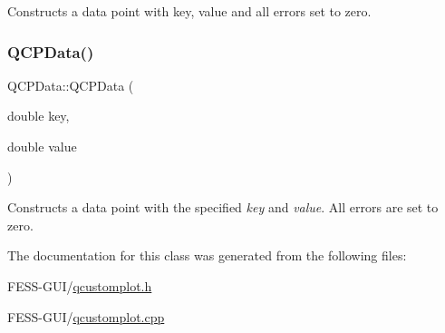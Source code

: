 Constructs a data point with key, value and all errors set to zero. \hypertarget{class_q_c_p_data_aa274181ae8de2a0907ba5464d3c2c103}{}\label{class_q_c_p_data_aa274181ae8de2a0907ba5464d3c2c103} 
\subsubsection{\texorpdfstring{Q\+C\+P\+Data()}{QCPData()}\hspace{0.1cm}{\footnotesize\ttfamily [2/2]}}
{\footnotesize\ttfamily Q\+C\+P\+Data\+::\+Q\+C\+P\+Data (\begin{DoxyParamCaption}\item[{double}]{key,  }\item[{double}]{value }\end{DoxyParamCaption})}

Constructs a data point with the specified {\itshape key} and {\itshape value}. All errors are set to zero. 

The documentation for this class was generated from the following files\+:\begin{DoxyCompactItemize}
\item 
F\+E\+S\+S-\/\+G\+U\+I/\hyperlink{qcustomplot_8h}{qcustomplot.\+h}\item 
F\+E\+S\+S-\/\+G\+U\+I/\hyperlink{qcustomplot_8cpp}{qcustomplot.\+cpp}\end{DoxyCompactItemize}
